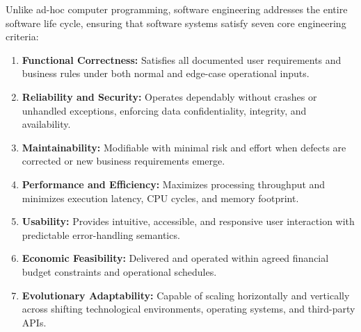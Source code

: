 Unlike ad-hoc computer programming, software engineering addresses the entire software life cycle, ensuring that software systems satisfy seven core engineering criteria:
\begin{enumerate}
    \item \textbf{Functional Correctness:} Satisfies all documented user requirements and business rules under both normal and edge-case operational inputs.
    \item \textbf{Reliability and Security:} Operates dependably without crashes or unhandled exceptions, enforcing data confidentiality, integrity, and availability.
    \item \textbf{Maintainability:} Modifiable with minimal risk and effort when defects are corrected or new business requirements emerge.
    \item \textbf{Performance and Efficiency:} Maximizes processing throughput and minimizes execution latency, CPU cycles, and memory footprint.
    \item \textbf{Usability:} Provides intuitive, accessible, and responsive user interaction with predictable error-handling semantics.
    \item \textbf{Economic Feasibility:} Delivered and operated within agreed financial budget constraints and operational schedules.
    \item \textbf{Evolutionary Adaptability:} Capable of scaling horizontally and vertically across shifting technological environments, operating systems, and third-party APIs.
\end{enumerate}

